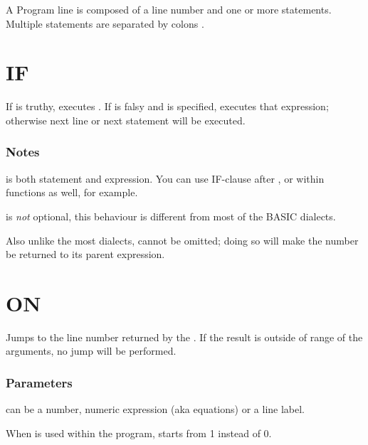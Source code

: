 \label{statements}

A Program line is composed of a line number and one or more statements. Multiple statements are separated by colons \code{:}.

\section{IF}


If  is truthy, executes . If  is falsy and  is specified, executes that expression; otherwise next line or next statement will be executed.

\subsubsection*{Notes}

\begin{itemlist}
\item {} is both statement and expression. You can use IF-clause after , or within functions as well, for example.
\item {} is \emph{not} optional, this behaviour is different from most of the BASIC dialects.
\item Also unlike the most dialects,  cannot be omitted; doing so will make the number be returned to its parent expression.
\end{itemlist}

\section{ON}


Jumps to the line number returned by the . If the result is outside of range of the arguments, no jump will be performed.

\subsubsection*{Parameters}

\begin{itemlist}
\item {} can be a number, numeric expression (aka equations) or a line label.
\item When  is used within the program,  starts from 1 instead of 0.
\end{itemlist}

